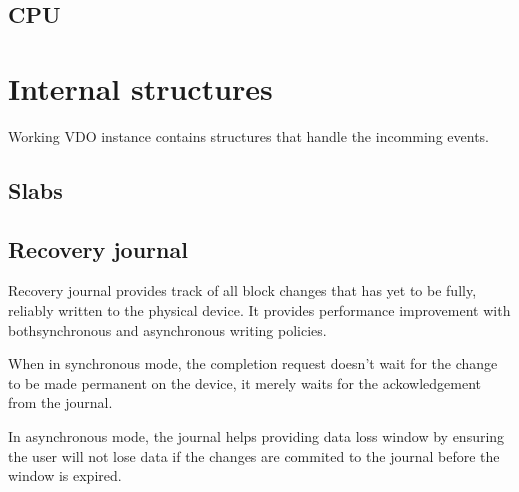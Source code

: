 \documentclass[
  color, %
  table, %
  lof,   %
  lot,   %
]{fithesis3}
\begin{document}




\subsection{CPU}

\section{Internal structures}
Working VDO instance contains structures that handle the incomming events.

\subsection{Slabs}

\subsection{Recovery journal}
Recovery journal provides track of all block changes that has yet to be fully, reliably written to the physical device. It provides performance improvement with bothsynchronous and asynchronous writing policies.

When in synchronous mode, the completion request doesn't wait for the change to be made permanent on the device, it merely waits for the ackowledgement from the journal.

In asynchronous mode, the journal helps providing data loss window by ensuring the user will not lose data if the changes are commited to the journal before the window is expired.
\end{document}
